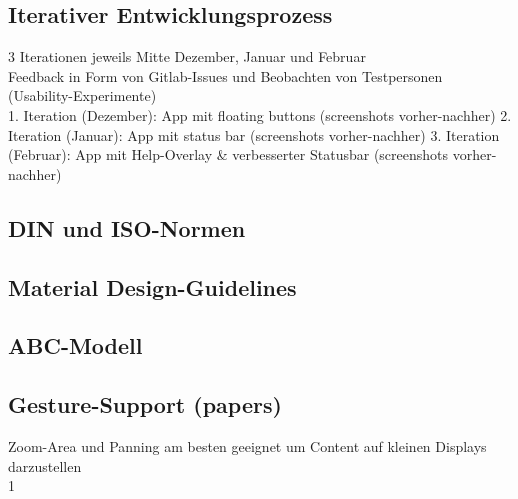 
  \subsection{Iterativer Entwicklungsprozess}
    3 Iterationen jeweils Mitte Dezember, Januar und Februar \\
    Feedback in Form von Gitlab-Issues und Beobachten von Testpersonen (Usability-Experimente) \\
    1. Iteration (Dezember): App mit floating buttons (screenshots vorher-nachher)
    2. Iteration (Januar): App mit status bar (screenshots vorher-nachher)
    3. Iteration (Februar): App mit Help-Overlay \& verbesserter Statusbar (screenshots vorher-nachher)
  \subsection{DIN und ISO-Normen}
  \subsection{Material Design-Guidelines}
  \subsection{ABC-Modell}
  \subsection{Gesture-Support (papers)}
    Zoom-Area und Panning am besten geeignet um Content auf kleinen Displays darzustellen \\


  
1